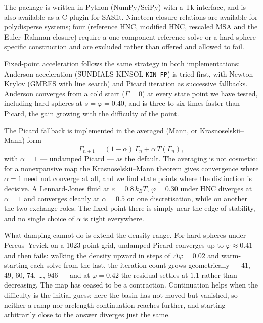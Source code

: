 \documentclass[11pt,a4paper]{article}
\newcommand{\code}[1]{\texttt{#1}}
\begin{document}
The package is written in Python (NumPy/SciPy) with a Tk interface, and is also
available as a C plugin for SASfit. Nineteen closure relations are available
for polydisperse systems; four (reference HNC, modified HNC, rescaled MSA and
the Euler--Rahman closure) require a one-component reference solve or a
hard-sphere-specific construction and are excluded rather than offered and
allowed to fail.

Fixed-point acceleration follows the same strategy in both implementations:
Anderson acceleration \citep{Anderson1965} (SUNDIALS KINSOL
\code{KIN\_FP}) is tried first, with
Newton--Krylov (GMRES with line search) and Picard iteration as successive
fallbacks. Anderson converges from a cold start ($\Gamma = 0$) at every state
point we have tested, including hard spheres at $s = \varphi = 0.40$, and is
three to six times faster than Picard, the gain growing with the difficulty of
the point.

The Picard fallback is implemented in the averaged (Mann, or
Krasnoselskii--Mann) form \citep{Mann1953}
\begin{equation}
\Gamma_{n+1} = (1-\alpha)\,\Gamma_n + \alpha\,T(\Gamma_n),
\label{eq:mann}
\end{equation}
with $\alpha = 1$ --- undamped Picard --- as the default. The averaging is not
cosmetic: for a nonexpansive map the Krasnoselskii--Mann theorem gives
convergence where $\alpha = 1$ need not converge at all, and we find state
points where the distinction is decisive. A Lennard-Jones fluid at
$\varepsilon = 0.8\,k_BT$, $\varphi = 0.30$ under HNC diverges at $\alpha = 1$
and converges cleanly at $\alpha = 0.5$ on one discretisation, while on
another the two exchange roles. The fixed point there is simply near the edge
of stability, and no single choice of $\alpha$ is right everywhere.

What damping cannot do is extend the density range. For hard spheres under
Percus--Yevick on a 1023-point grid, undamped Picard converges up to
$\varphi \approx 0.41$ and then fails: walking the density upward in steps of
$\Delta\varphi = 0.02$ and warm-starting each solve from the last, the
iteration count grows geometrically --- 41, 49, 60, 74, \ldots, 946 --- and at
$\varphi = 0.42$ the residual settles at $1.1$ rather than decreasing. The
map has ceased to be a contraction. Continuation helps when the difficulty is
the initial guess; here the basin has not moved but vanished, so neither a
ramp nor arclength continuation reaches further, and starting arbitrarily
close to the answer diverges just the same.
\end{document}
